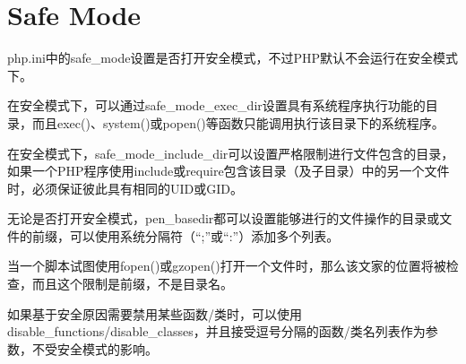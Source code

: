 \section{Safe Mode}

php.ini中的safe\_mode设置是否打开安全模式，不过PHP默认不会运行在安全模式下。

在安全模式下，可以通过safe\_mode\_exec\_dir设置具有系统程序执行功能的目录，而且exec()、system()或popen()等函数只能调用执行该目录下的系统程序。

在安全模式下，safe\_mode\_include\_dir可以设置严格限制进行文件包含的目录，如果一个PHP程序使用include或require包含该目录（及子目录）中的另一个文件时，必须保证彼此具有相同的UID或GID。

无论是否打开安全模式，pen\_basedir都可以设置能够进行的文件操作的目录或文件的前缀，可以使用系统分隔符（“;”或“:”）添加多个列表。

当一个脚本试图使用fopen()或gzopen()打开一个文件时，那么该文家的位置将被检查，而且这个限制是前缀，不是目录名。

如果基于安全原因需要禁用某些函数/类时，可以使用disable\_functions/disable\_classes，并且接受逗号分隔的函数/类名列表作为参数，不受安全模式的影响。


























































































